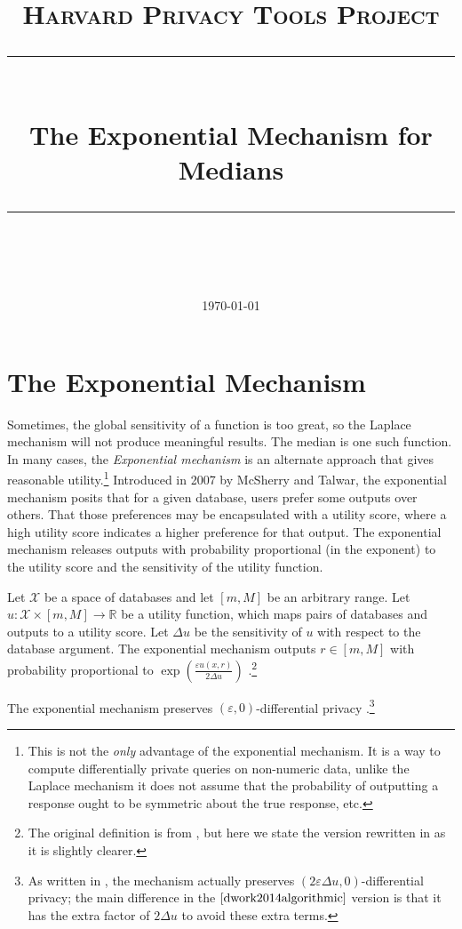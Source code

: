 \documentclass[11pt]{scrartcl} %
\title{
	\normalfont\normalsize
	\textsc{Harvard Privacy Tools Project}\\ %
	\vspace{25pt} %
	\rule{\linewidth}{0.5pt}\\ %
	\vspace{20pt} %
	{\huge The Exponential Mechanism for Medians}\\ %
	\vspace{12pt} %
	\rule{\linewidth}{2pt}\\ %
	\vspace{12pt} %
}
\date{\normalsize\today} %
\begin{document}
\maketitle

\section{The Exponential Mechanism}

Sometimes, the global sensitivity of a function is too great, so the Laplace mechanism will not produce meaningful results. The median is one such function. In many cases, the \textit{Exponential mechanism} is an alternate approach that gives reasonable utility.\footnote{This is not the \textit{only} advantage of the exponential mechanism. It is a way to compute differentially private queries on non-numeric data, unlike the Laplace mechanism it does not assume that the probability of outputting a response ought to be symmetric about the true response, etc.} Introduced in 2007 by McSherry and Talwar, the exponential mechanism posits that for a given database, users prefer some outputs over others. That those preferences may be encapsulated with a utility score, where a high utility score indicates a higher preference for that output. The exponential mechanism releases outputs with probability proportional (in the exponent) to the utility score and the sensitivity of the utility function. 

\begin{definition}  
Let $\mathcal{X}$ be a space of databases and let $[m,M]$ be an arbitrary range. Let $u: \mathcal{X} \times [m,M] \rightarrow \mathbb{R}$ be a utility function, which maps pairs of databases and outputs to a utility score. Let $\Delta u$ be the sensitivity of $u$ with respect to the database argument. The exponential mechanism outputs $r \in [m,M]$ with probability proportional to $\exp\left(\frac{\varepsilon u(x,r)}{2 \Delta u}\right)$ \cite{mcsherry2007mechanism, dwork2014algorithmic}.\footnote{The original definition is from \cite{mcsherry2007mechanism}, but here we state the version rewritten in \cite{dwork2014algorithmic} as it is slightly clearer.}
\end{definition}

\begin{theorem}
The exponential mechanism preserves $(\varepsilon,0)$-differential privacy \cite{mcsherry2007mechanism, dwork2014algorithmic}.\footnote{As written in \cite{mcsherry2007mechanism}, the mechanism actually preserves $(2\varepsilon\Delta u,0)$-differential privacy; the main difference in the $\cite{dwork2014algorithmic}$ version is that it has the extra factor of $2\Delta u$ to avoid these extra terms.}
\end{theorem}
\end{document}
